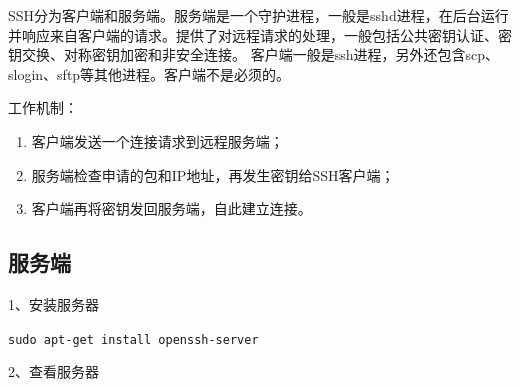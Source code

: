 SSH分为客户端和服务端。服务端是一个守护进程，一般是sshd进程，在后台运行并响应来自客户端的请求。提供了对远程请求的处理，一般包括公共密钥认证、密钥交换、对称密钥加密和非安全连接。
客户端一般是ssh进程，另外还包含scp、slogin、sftp等其他进程。客户端不是必须的。

工作机制：
\begin{enumerate}
\item 客户端发送一个连接请求到远程服务端；
\item 服务端检查申请的包和IP地址，再发生密钥给SSH客户端；
\item 客户端再将密钥发回服务端，自此建立连接。
\end{enumerate}


\subsection{服务端}
1、安装服务器

\verb|sudo apt-get install openssh-server|

2、查看服务器

